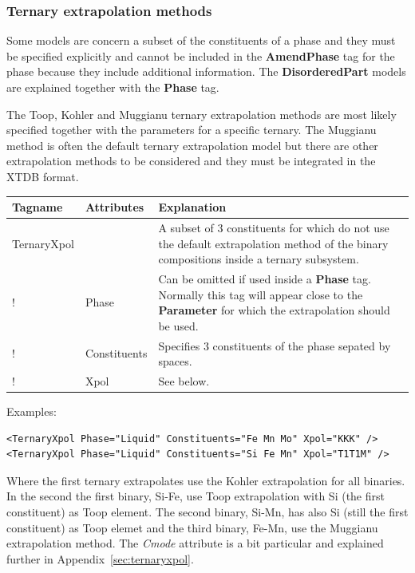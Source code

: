 \documentclass{article}
\begin{document}
\subsubsection{Ternary extrapolation methods}\label{sec:toop}

Some models are concern a subset of the constituents of a phase and
they must be specified explicitly and cannot be included in the {\bf
  AmendPhase} tag for the phase because they include additional
information.  The {\bf DisorderedPart} 
models are explained together with the {\bf Phase} tag.

The Toop, Kohler and Muggianu ternary extrapolation methods are most
likely specified together with the parameters for a specific ternary.
The Muggianu method is often the default ternary extrapolation model
but there are other extrapolation methods to be considered and they
must be integrated in the XTDB format.

\begin{tabular}{|p{} p{} p{}|}\hline
  Tagname& Attributes & Explanation\\\hline

  TernaryXpol & & A subset of 3 constituents for which do not use the default
              extrapolation method of the binary compositions inside
              a ternary subsystem.\\
!       & Phase & Can be omitted if used inside a {\bf Phase} tag.  Normally  
              this tag will appear close to the {\bf Parameter} for which the
              extrapolation should be used.\\
!      & Constituents & Specifies 3 constituents of the phase sepated by
          spaces.\\
!      & Xpol & See below.\\\hline
\end{tabular}

Examples:

\begin{verbatim}
<TernaryXpol Phase="Liquid" Constituents="Fe Mn Mo" Xpol="KKK" />
<TernaryXpol Phase="Liquid" Constituents="Si Fe Mn" Xpol="T1T1M" />
\end{verbatim}

Where the first ternary extrapolates use the Kohler extrapolation for
all binaries.  In the second the first binary, Si-Fe, use Toop
extrapolation with Si (the first constituent) as Toop element.  The
second binary, Si-Mn, has also Si (still the first constituent) as
Toop elemet and the third binary, Fe-Mn, use the Muggianu
extrapolation method.  The {\em Cmode} attribute is a bit particular
and explained further in Appendix~\ref{sec:ternaryxpol}.
\end{document}
